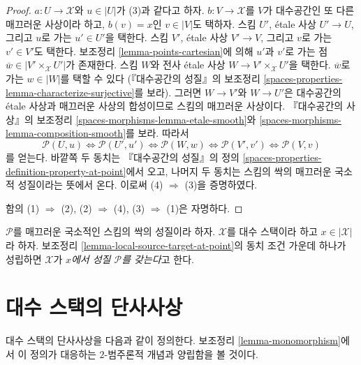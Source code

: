 \begin{proof}
$a : U \to \mathcal{X}$와 $u \in |U|$가 (3)과 같다고 하자.
$b : V \to \mathcal{X}$를 $V$가 대수공간인 또 다른 매끄러운
사상이라 하고, $b(v) = x$인 $v \in |V|$도 택하자.
스킴 $U'$, \'etale 사상 $U' \to U$, 그리고 $u$로 가는
$u' \in U'$을 택한다. 스킴 $V'$, \'etale 사상 $V' \to V$,
그리고 $v$로 가는 $v' \in V'$도 택한다.
보조정리 \ref{lemma-points-cartesian}에 의해 $u'$과 $v'$로 가는 점
$\overline{w} \in |V' \times_\mathcal{X} U'|$가 존재한다.
스킴 $W$와 전사 \'etale 사상
$W \to V' \times_\mathcal{X} U'$을 택한다.
$\overline{w}$로 가는 $w \in |W|$를 택할 수 있다
(『대수공간의 성질』의 보조정리
\ref{spaces-properties-lemma-characterize-surjective}를 보라).
그러면 $W \to V'$와 $W \to U'$은 대수공간의 \'etale 사상과
매끄러운 사상의 합성이므로 스킴의 매끄러운 사상이다.
『대수공간의 사상』의 보조정리
\ref{spaces-morphisms-lemma-etale-smooth}와
\ref{spaces-morphisms-lemma-composition-smooth}를 보라. 따라서
$$
\mathcal{P}(U, u)
\Leftrightarrow
\mathcal{P}(U', u')
\Leftrightarrow
\mathcal{P}(W, w)
\Leftrightarrow
\mathcal{P}(V', v')
\Leftrightarrow
\mathcal{P}(V, v)
$$
를 얻는다. 바깥쪽 두 동치는 『대수공간의 성질』의 정의
\ref{spaces-properties-definition-property-at-point}에서 오고,
나머지 두 동치는 스킴의 싹의 매끄러운 국소적 성질이라는 뜻에서 온다.
이로써 (4) $\Rightarrow$ (3)을 증명하였다.

\medskip\noindent
함의 (1) $\Rightarrow$ (2), (2) $\Rightarrow$ (4),
(3) $\Rightarrow$ (1)은 자명하다.
\end{proof}

\begin{definition}
\label{definition-property-at-point}
$\mathcal{P}$를 매끄러운 국소적인 스킴의 싹의 성질이라 하자.
$\mathcal{X}$를 대수 스택이라 하고 $x \in |\mathcal{X}|$라 하자.
보조정리 \ref{lemma-local-source-target-at-point}의 동치 조건 가운데
하나가 성립하면 $\mathcal{X}$가
{\it $x$에서 성질 $\mathcal{P}$를 갖는다}고 한다.
\end{definition}










\section{대수 스택의 단사사상}
\label{section-monomorphisms}

\noindent
대수 스택의 단사사상을 다음과 같이 정의한다.
보조정리 \ref{lemma-monomorphism}에서 이 정의가 대응하는
$2$-범주론적 개념과 양립함을 볼 것이다.


